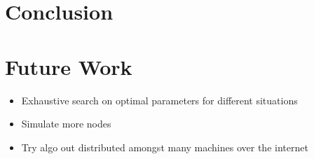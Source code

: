 \section{Conclusion}

\section{Future Work}
\begin{itemize}
	\item Exhaustive search on optimal parameters for different situations
	\item Simulate more nodes
	\item Try algo out distributed amongst many machines over the internet
\end{itemize}
